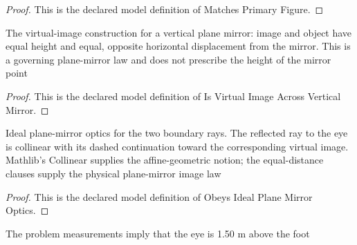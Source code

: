 \begin{proof}
  This is the declared model definition of Matches Primary Figure.
\end{proof}
\begin{definition}
  \label{def:physics:phyx-mini-0141:phyxminiproblems-problemphyxmini0141-isvirtualimageacrossverticalmirror}
  The virtual-image construction for a vertical plane mirror: image and object have equal height and equal, opposite horizontal displacement from the mirror. This is a governing plane-mirror law and does not prescribe the height of the mirror point
\end{definition}
\begin{proof}
  This is the declared model definition of Is Virtual Image Across Vertical Mirror.
\end{proof}
\begin{definition}
  \label{def:physics:phyx-mini-0141:phyxminiproblems-problemphyxmini0141-obeysidealplanemirroroptics}
  Ideal plane-mirror optics for the two boundary rays. The reflected ray to the eye is collinear with its dashed continuation toward the corresponding virtual image. Mathlib's Collinear supplies the affine-geometric notion; the equal-distance clauses supply the physical plane-mirror image law
\end{definition}
\begin{proof}
  This is the declared model definition of Obeys Ideal Plane Mirror Optics.
\end{proof}
\begin{lemma}
  \label{lem:physics:phyx-mini-0141:phyxminiproblems-problemphyxmini0141-eyeheight-eq-threehalves}
  The problem measurements imply that the eye is 1.50 m above the foot
\end{lemma}
